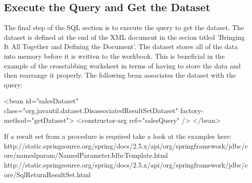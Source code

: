 \documentclass[letterpaper,10pt]{article}
\begin{document}
\subsection{Execute the Query and Get the Dataset}
The final step of the SQL section is to execute the query to get the dataset.  The dataset is defined at the end of the XML document in the secion titled 'Bringing It All Together and Defining the Document'.  The dataset stores all of the data into memory before it is written to the workbook.  This is beneficial in the example of the crosstabbing worksheet in terms of having to store the data and then rearrange it properly.  The following bean associates the dataset with the query:
\begin{verbatimtab}
 <bean id="salesDataset" class="org.javautil.dataset.DisassociatedResultSetDataset"
		factory-method="getDataset">
		<constructor-arg ref="salesQuery" />
 </bean>
\end{verbatimtab}

If a result set from a procedure is required take a look at the examples here:
 http://static.springsource.org/spring/docs/2.5.x/api/org/springframework/jdbc/core/namedparam/NamedParameterJdbcTemplate.html
 http://static.springsource.org/spring/docs/2.5.x/api/org/springframework/jdbc/core/SqlReturnResultSet.html
\end{document}
